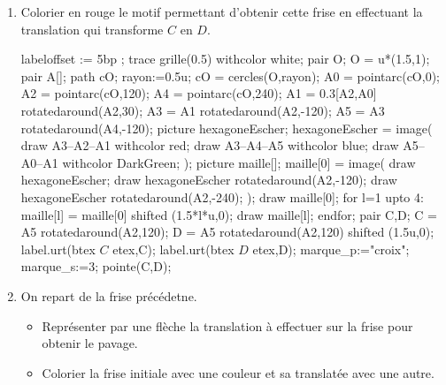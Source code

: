 \begin{exercice*}
    \begin{changemargin}{0mm}{-5mm}
        \begin{enumerate}
            \item Colorier en rouge le motif permettant d'obtenir cette frise en effectuant la translation qui transforme $C$ en $D$.\\            
            \begin{Geometrie}[CoinHD={(8u,3u)}]
                labeloffset := 5bp ;
                trace grille(0.5) withcolor white;
                pair O;
                O = u*(1.5,1);
                pair A[];
                path cO;
                rayon:=0.5u;
                cO = cercles(O,rayon);
                A0 = pointarc(cO,0);
                A2 = pointarc(cO,120);
                A4 = pointarc(cO,240);
                A1 = 0.3[A2,A0] rotatedaround(A2,30);
                A3 = A1 rotatedaround(A2,-120);
                A5 = A3 rotatedaround(A4,-120);        
                picture hexagoneEscher;
                hexagoneEscher = image(
                    draw A3--A2--A1 withcolor red;        
                        draw A3--A4--A5 withcolor blue;        
                        draw A5--A0--A1 withcolor DarkGreen;
                );
                picture maille[];
                maille[0] = image(
                    draw hexagoneEscher;
                    draw hexagoneEscher rotatedaround(A2,-120);
                    draw hexagoneEscher rotatedaround(A2,-240);
                );        
                draw maille[0];
                for l=1 upto 4:
                    maille[l] = maille[0] shifted (1.5*l*u,0);
                    draw maille[l];
                endfor;
                pair C,D;
                C = A5 rotatedaround(A2,120);
                D = A5 rotatedaround(A2,120) shifted (1.5u,0);
                label.urt(btex $C$ etex,C);
                label.urt(btex $D$ etex,D);
                marque_p:="croix";
                marque_s:=3;
                pointe(C,D);
            \end{Geometrie}
            \item On repart de la frise précédetne.
            \begin{itemize}
                \item Représenter par une flèche la translation à effectuer sur la frise pour obtenir le pavage.
                \item Colorier la frise initiale avec une couleur et sa translatée avec une autre.

\end{itemize}
\end{enumerate}
\end{changemargin}
\end{exercice*}
